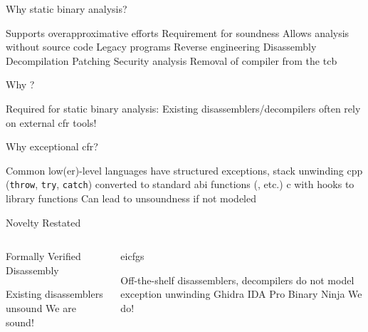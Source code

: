 \begin{frame}{Why static binary analysis?}
  \begin{outline}
    \1 Supports \alert{overapproximative} efforts
      \2 Requirement for \alert{soundness}
    \1 Allows analysis without source code
      \2 Legacy programs
      \2 Reverse engineering
        \3 Disassembly
        \3 Decompilation
      \2 Patching
      \2 Security analysis
    \2 Removal of compiler from the \gls{tcb}
  \end{outline}

\end{frame}

\begin{frame}{Why ?}
  \begin{center}
    Required for static binary analysis: Existing disassemblers/decompilers often rely on external \gls{cfr} tools!
  \end{center}

\end{frame}

\begin{frame}{Why exceptional \gls{cfr}?}
  \begin{outline}
    \1 Common low(er)-level languages have structured exceptions, stack unwinding
      \2 \Gls{cpp} (\lstinline|throw|, \lstinline|try|, \lstinline|catch|) converted to standard \gls{abi} functions (, etc.)
      \2 \Gls{c} with hooks to library functions
    \1 Can lead to \alert{unsoundness} if not modeled
  \end{outline}
\end{frame}

\begin{frame}{Novelty Restated}
  \begin{columns}[t]
    \begin{block}{Formally Verified Disassembly}
      \begin{outline}
        \1 Existing disassemblers \alert{unsound} %
        \1 We are \alert{sound}!
      \end{outline}
    \end{block}

    \begin{block}{\Glspl{eicfg}}
      \begin{outline}
        \1 Off-the-shelf \alert{disassemblers, decompilers} do not model exception unwinding
          \2 Ghidra %
          \2 IDA Pro
          \2 Binary Ninja
        \1 We do!
      \end{outline}
    \end{block}
  \end{columns}
\end{frame}
